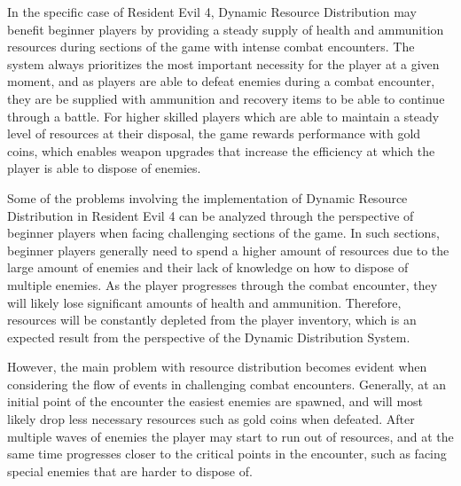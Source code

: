 In the specific case of Resident Evil 4, Dynamic Resource Distribution may benefit beginner players by providing a steady supply of health and ammunition resources during sections of the game with intense combat encounters. The system always prioritizes the most important necessity for the player at a given moment, and as players are able to defeat enemies during a combat encounter, they are be supplied with ammunition and recovery items to be able to continue through a battle. For higher skilled players which are able to maintain a steady level of resources at their disposal, the game rewards performance with gold coins, which enables weapon upgrades that increase the efficiency at which the player is able to dispose of enemies. 



Some of the problems involving the implementation of Dynamic Resource Distribution in Resident Evil 4 can be analyzed through the perspective of beginner players when facing challenging sections of the game. In such sections, beginner players generally need to spend a higher amount of resources due to the large amount of enemies and their lack of knowledge on how to dispose of multiple enemies. As the player progresses through the combat encounter, they will likely lose significant amounts of health and ammunition. Therefore, resources will be constantly depleted from the player inventory, which is an expected result from the perspective of the Dynamic Distribution System. 

However, the main problem with resource distribution becomes evident when considering the flow of events in challenging combat encounters. Generally, at an initial point of the encounter the easiest enemies are spawned, and will most likely drop less necessary resources such as gold coins when defeated. After multiple waves of enemies the player may start to run out of resources, and at the same time progresses closer to the critical points in the encounter, such as facing special enemies that are harder to dispose of.


